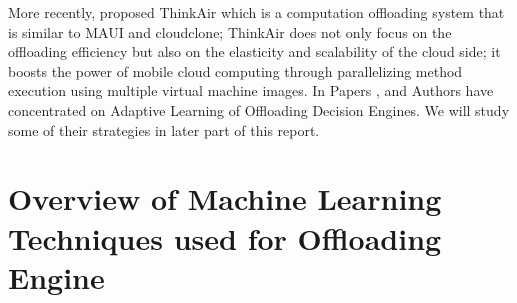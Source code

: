 \documentclass{report}
\begin{document}
More recently, \cite{kosta2012thinkair} proposed ThinkAir which is a
computation offloading system that is similar to MAUI and
cloudclone; ThinkAir does not only focus on the offloading
efficiency but also on the elasticity and scalability of the
cloud side; it boosts the power of mobile cloud computing
through parallelizing method execution using multiple
virtual machine images. 
In Papers \cite{flores2013adaptive}, \cite{khairy2013smartphone} and \cite{kemp2012cuckoo} Authors have concentrated on Adaptive Learning of Offloading Decision Engines. We will study some of their strategies in later part of this report. 

\chapter{Overview of Machine Learning Techniques used for Offloading Engine} %
\label{chap:OverviewMachineLearning}
\end{document}
